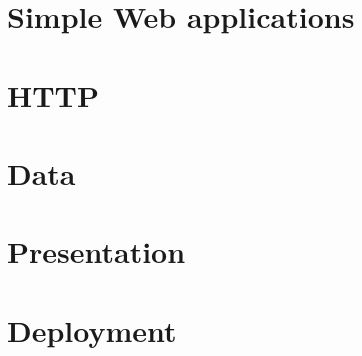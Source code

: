 \documentclass[10pt,twoside,english,showtrims]{support/latex/sbabook/sbabook}
\begin{document}
\tableofcontents

\mainmatter

\part{Simple Web applications}



\part{HTTP}






\part{Data}






\part{Presentation}





\part{Deployment}


\backmatter
\end{document}
